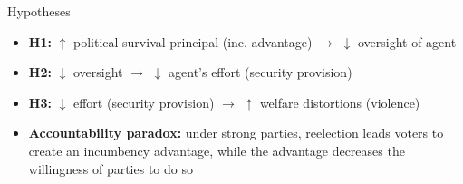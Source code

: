 \documentclass{beamer}
\begin{document}
\begin{frame}[label=hypotheses]{Hypotheses}

\begin{itemize}
 		  \setlength\itemsep{1em}
 
	\item \textbf{H1:} $\uparrow$ political survival principal (inc. advantage) $\rightarrow$ $\downarrow$ oversight of agent
	
	\item \textbf{H2:} $\downarrow$ oversight $\rightarrow$ $\downarrow$  agent's effort (security provision)
	
	\item \textbf{H3:} $\downarrow$ effort (security provision) $\rightarrow$ $\uparrow$ welfare distortions (violence)
	
\bigskp

\item \textbf{Accountability paradox:} under strong parties, reelection leads voters to create an incumbency advantage, while the advantage decreases the willingness of parties to do so

\end{itemize} 
	
\end{frame} 

\end{document}
